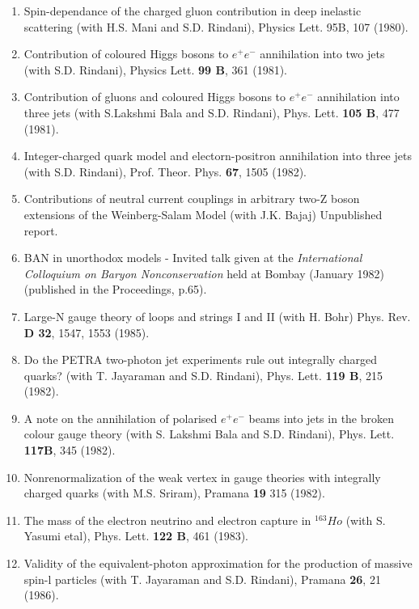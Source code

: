 \begin{enumerate}
\item Spin-dependance of the charged gluon contribution in deep
inelastic scattering (with H.S. Mani and S.D. Rindani), Physics Lett.
95B, 107 (1980).

\item Contribution of coloured Higgs bosons to $e^+ e^-$ annihilation
into two jets (with S.D. Rindani), Physics Lett. {\bf 99 B}, 361 (1981).

\item Contribution of gluons and coloured Higgs bosons to $e^+ e^-$
annihilation into three jets (with S.Lakshmi Bala and S.D. Rindani),
Phys. Lett. {\bf 105 B}, 477 (1981).

\item Integer-charged quark model and electorn-positron annihilation
into three jets (with S.D. Rindani), Prof. Theor. Phys. {\bf 67}, 1505 (1982).

\item Contributions of neutral current couplings in arbitrary two-Z
boson extensions of the Weinberg-Salam Model (with J.K. Bajaj)
Unpublished report.

\item BAN in unorthodox models - Invited talk given at the {\it International
Colloquium on Baryon Nonconservation} held at Bombay (January 1982)
(published in the Proceedings, p.65).

\item Large-N gauge theory of loops and strings I and II (with H. Bohr)
Phys. Rev. {\bf D 32}, 1547, 1553 (1985).

\item Do the PETRA two-photon jet experiments rule out integrally
charged quarks?  (with T. Jayaraman and S.D. Rindani), Phys. Lett. {\bf
119 B}, 215 (1982).

\item A note on the annihilation of polarised $e^+ e^-$ beams into jets
in the broken colour gauge theory (with S. Lakshmi Bala and S.D.
Rindani), Phys. Lett. {\bf 117B}, 345 (1982).

\item Nonrenormalization of the weak vertex in gauge theories with
integrally charged quarks (with M.S. Sriram), Pramana {\bf 19} 315
(1982). 

\item The mass of the electron neutrino and electron capture in
$^{163}Ho$ (with S. Yasumi etal), Phys. Lett. {\bf 122 B}, 461 (1983).

\item Validity of the equivalent-photon approximation for the production
of massive spin-l particles (with T. Jayaraman and S.D. Rindani), Pramana
{\bf 26}, 21 (1986).


\end{enumerate}
